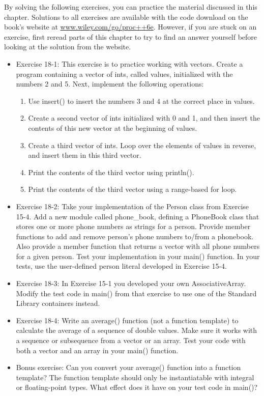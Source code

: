 By solving the following exercises, you can practice the material discussed in this chapter. Solutions to all exercises are available with the code download on the book’s website at \url{www.wiley.com/go/proc++6e}. However, if you are stuck on an exercise, first reread parts of this chapter to try to find an answer yourself before looking at the solution from the website.

\begin{itemize}
\item
Exercise 18-1: This exercise is to practice working with vectors. Create a program containing a vector of ints, called values, initialized with the numbers 2 and 5. Next, implement the following operations:
\begin{enumerate}
\item
Use insert() to insert the numbers 3 and 4 at the correct place in values.

\item
Create a second vector of ints initialized with 0 and 1, and then insert the contents of this new vector at the beginning of values.

\item
Create a third vector of ints. Loop over the elements of values in reverse, and insert them in this third vector.

\item
Print the contents of the third vector using println().

\item
Print the contents of the third vector using a range-based for loop.
\end{enumerate}

\item
Exercise 18-2: Take your implementation of the Person class from Exercise 15-4. Add a new module called phone\_book, defining a PhoneBook class that stores one or more phone numbers as strings for a person. Provide member functions to add and remove person’s phone numbers to/from a phonebook. Also provide a member function that returns a vector with all phone numbers for a given person. Test your implementation in your main() function. In your tests, use the user-defined person literal developed in Exercise 15-4.

\item
Exercise 18-3: In Exercise 15-1 you developed your own AssociativeArray. Modify the test code in main() from that exercise to use one of the Standard Library containers instead.

\item
Exercise 18-4: Write an average() function (not a function template) to calculate the average of a sequence of double values. Make sure it works with a sequence or subsequence from a vector or an array. Test your code with both a vector and an array in your main() function.

\item
Bonus exercise: Can you convert your average() function into a function template? The function template should only be instantiatable with integral or floating-point types. What effect does it have on your test code in main()?
\end{itemize}














